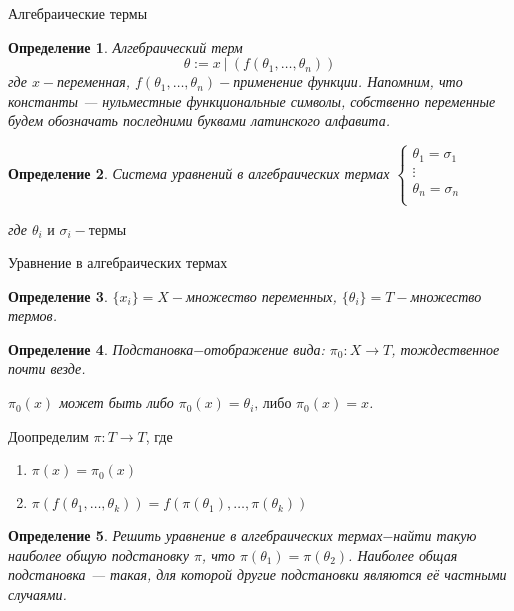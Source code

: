 \documentclass[handout]{beamer}
\newtheorem{dfn}{Определение}[section]
\begin{document}
\begin{frame}{Алгебраические термы}
	\begin{dfn}Алгебраический терм $$\theta := x\:|\:(f(\theta_1,\ldots,\theta_n))$$ 
где $x-$переменная, $f(\theta_1,\ldots,\theta_n)-$применение функции. Напомним, что константы --- нульместные
функциональные символы, собственно переменные будем обозначать последними буквами латинского алфавита. \end{dfn}
	\begin{dfn}Система уравнений в алгебраических термах
	$
		\begin{cases}
			\theta_1=\sigma_1&\\
			\vdots&\\
			\theta_n=\sigma_n&\\
		\end{cases}
	$\par где $\theta_i \text{ и } \sigma_i-\text{термы}$\par
\end{dfn}
\end{frame}
\begin{frame}{Уравнение в алгебраических термах}
	\begin{dfn}$\{x_i\}=X-$множество переменных, $\{\theta_i\}=T-$множество термов.\end{dfn}
	\begin{dfn}Подстановка$-$отображение вида: $\pi_0:X\to T$, тождественное почти везде.
        \par $\pi_0(x)$ может быть либо $\pi_0(x)=\theta_i\text{, либо }\pi_0(x)=x$.\end{dfn} 
	Доопределим $\pi:T\to T$, где \begin{enumerate}
		\item $\pi(x)=\pi_0(x)$
		\item $\pi(f(\theta_1, \ldots, \theta_k))=f(\pi(\theta_1), \ldots, \pi(\theta_k))$
	\end{enumerate}
	
	\begin{dfn}Решить уравнение в алгебраических термах$-$найти такую наиболее общую подстановку $\pi$, 
        что $\pi(\theta_1)=\pi(\theta_2)$.
Наиболее общая подстановка --- такая, для которой другие подстановки являются её частными случаями.\end{dfn} 
\end{frame}
\end{document}
